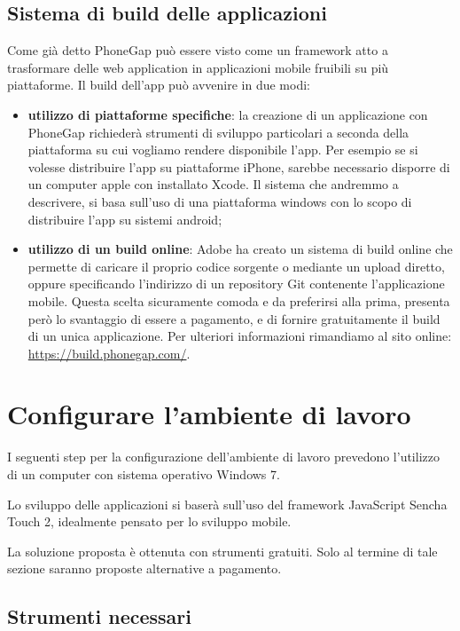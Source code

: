 \documentclass[10pt,a4paper,onecolumn]{article}
\begin{document}
\subsection{Sistema di build delle applicazioni}

	Come già detto PhoneGap può essere visto come un framework atto a trasformare delle web application in applicazioni mobile fruibili su più piattaforme. Il build dell'app può avvenire in due modi:
	
\begin{itemize}
	\item \textbf{utilizzo di piattaforme specifiche}: la creazione di un applicazione con PhoneGap richiederà strumenti di sviluppo particolari a seconda della piattaforma su cui vogliamo rendere disponibile l'app. Per esempio se si volesse distribuire l'app su piattaforme iPhone, sarebbe necessario disporre di un computer apple con installato Xcode. Il sistema che andremmo a descrivere, si basa sull'uso di una piattaforma windows con lo scopo di distribuire l'app su sistemi android;
	
	\item \textbf{utilizzo di un build online}: Adobe ha creato un sistema di build online che permette di caricare il proprio codice sorgente o mediante un upload diretto, oppure specificando l'indirizzo di un repository Git contenente l'applicazione mobile. Questa scelta sicuramente comoda e da preferirsi alla prima, presenta però lo svantaggio di essere a pagamento, e di fornire gratuitamente il build di un unica applicazione. Per ulteriori informazioni rimandiamo al sito online: \url{https://build.phonegap.com/}.
\end{itemize}

\clearpage

\section{Configurare l'ambiente di lavoro}

I seguenti step per la configurazione dell'ambiente di lavoro prevedono l'utilizzo di un computer con sistema operativo Windows 7.

Lo sviluppo delle applicazioni si baserà sull'uso del framework JavaScript Sencha Touch 2, idealmente pensato per lo sviluppo mobile.

La soluzione proposta è ottenuta con strumenti gratuiti. Solo al termine di tale sezione saranno proposte alternative a pagamento.

\subsection{Strumenti necessari}
\end{document}
